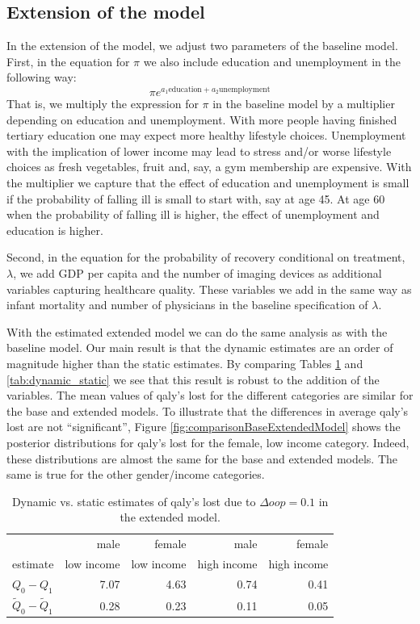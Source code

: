 \documentclass[a4paper,12pt]{article}
\begin{document}
\subsection{Extension of the model}
\label{sec:org659885d}

In the extension of the model, we adjust two parameters of the baseline model. First, in the equation for \(\pi\) we also include education and unemployment in the following way:
\begin{equation}
\pi e^{a_1 \text{education} + a_2 \text{unemployment}}
\end{equation}
That is, we multiply the expression for \(\pi\) in the baseline model by a multiplier depending on education and unemployment. With more people having finished tertiary education one may expect more healthy lifestyle choices. Unemployment with the implication of lower income may lead to stress and/or worse lifestyle choices as fresh vegetables, fruit and, say, a gym membership are expensive. With the multiplier we capture that the effect of education and unemployment is small if the probability of falling ill is small to start with, say at age 45. At age 60 when the probability of falling ill is higher, the effect of unemployment and education is higher.

Second, in the equation for the probability of recovery conditional on treatment, \(\lambda\), we add GDP per capita and the number of imaging devices as additional variables capturing healthcare quality. These variables we add in the same way as infant mortality and number of physicians in the baseline specification of \(\lambda\).

With the estimated extended model we can do the same analysis as with the baseline model. Our main result is that the dynamic estimates are an order of magnitude higher than the static estimates. By comparing Tables \ref{tab:dynamic_static_extended} and \ref{tab:dynamic_static} we see that this result is robust to the addition of the variables. The mean values of qaly's lost for the different categories are similar for the base and extended models. To illustrate that the differences in average qaly's lost are not ``significant'', Figure \ref{fig:comparisonBaseExtendedModel} shows the posterior distributions for qaly's lost for the female, low income category. Indeed, these distributions are almost the same for the base and extended models. The same is true for the other gender/income categories.

\begin{table}[htbp]
\caption{\label{tab:dynamic_static_extended}Dynamic vs. static estimates of qaly's lost due to \(\Delta oop = 0.1\) in the extended model.}
\centering
\begin{tabular}{lrrrr}
 & male & female & male & female\\
estimate & low income & low income & high income & high income\\
\hline
\(Q_0 - Q_1\) & 7.07 & 4.63 & 0.74 & 0.41\\
\(\tilde Q_0 - \tilde Q_1\) & 0.28 & 0.23 & 0.11 & 0.05\\
\end{tabular}
\end{table}
\end{document}
